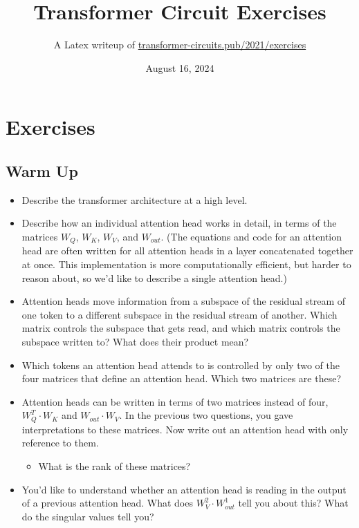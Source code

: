 \documentclass[11pt]{article}
\begin{document}
\title{\textbf{Transformer Circuit Exercises}}
\author{A Latex writeup of \href{https://transformer-circuits.pub/2021/exercises}{transformer-circuits.pub/2021/exercises}}
\date{August 16, 2024}
\maketitle


\section*{Exercises}

\subsection*{Warm Up}

\begin{itemize}
    \item Describe the transformer architecture at a high level.

    \item Describe how an individual attention head works in detail, in terms of the matrices $W_Q$, $W_K$, $W_V$, and $W_{out}$. (The equations and code for an attention head are often written for all attention heads in a layer concatenated together at once. This implementation is more computationally efficient, but harder to reason about, so we'd like to describe a single attention head.)
    
    \item Attention heads move information from a subspace of the residual stream of one token to a different subspace in the residual stream of another. Which matrix controls the subspace that gets read, and which matrix controls the subspace written to? What does their product mean?
    
    \item Which tokens an attention head attends to is controlled by only two of the four matrices that define an attention head. Which two matrices are these?
    
    \item Attention heads can be written in terms of two matrices instead of four, $W_Q^T \cdot W_K$ and $W_{out} \cdot W_V$. In the previous two questions, you gave interpretations to these matrices. Now write out an attention head with only reference to them.
    \begin{itemize}
        \item What is the rank of these matrices?
    \end{itemize}
    
    \item You'd like to understand whether an attention head is reading in the output of a previous attention head. What does $W_V^2 \cdot W_{out}^1$ tell you about this? What do the singular values tell you?
\end{itemize}
\end{document}
